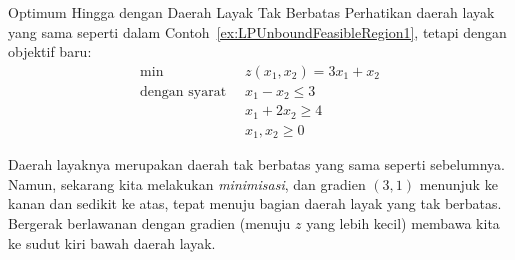 \begin{example}{Optimum Hingga dengan Daerah Layak Tak Berbatas}\label{exa:LPUnboundFiniteSoln}
Perhatikan daerah layak yang sama seperti dalam Contoh~\ref{ex:LPUnboundFeasibleRegion1}, tetapi dengan objektif baru:
\begin{equation}
\begin{aligned}
\min\;\;& z(x_1,x_2) = 3x_1 + x_2\\
\text{dengan syarat}\;\;& x_1 - x_2 \leq 3\\
& x_1 + 2x_2 \geq 4\\
&x_1,x_2 \geq 0
\end{aligned}
\label{eqn:LPUnboundFiniteSoln}
\end{equation}
\end{example}
\begin{solution}
Daerah layaknya merupakan daerah tak berbatas yang sama seperti sebelumnya. Namun, sekarang kita melakukan \emph{minimisasi}, dan gradien $(3,1)$ menunjuk ke kanan dan sedikit ke atas, tepat menuju bagian daerah layak yang tak berbatas. Bergerak berlawanan dengan gradien (menuju $z$ yang lebih kecil) membawa kita ke sudut kiri bawah daerah layak.

\begin{figure}[H]
\centering
{}
\end{figure}
\end{solution}
